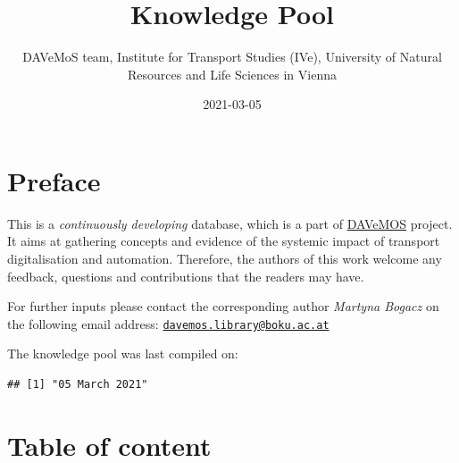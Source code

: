 \documentclass[
]{book}
\title{Knowledge Pool}
\author{DAVeMoS team, Institute for Transport Studies (IVe), University of Natural Resources and Life Sciences in Vienna}
\date{2021-03-05}
\begin{document}
\maketitle

{
\setcounter{tocdepth}{1}
\tableofcontents
}
\hypertarget{preface}{%
\chapter*{Preface}\label{preface}}

This is a \emph{continuously developing} database, which is a part of \href{https://www.davemos.online/}{DAVeMOS} project. It aims at gathering concepts and evidence of the systemic impact of transport digitalisation and automation. Therefore, the authors of this work welcome any feedback, questions and contributions that the readers may have.

For further inputs please contact the corresponding author \emph{Martyna Bogacz} on the following email address: \href{mailto:davemos.library@boku.ac.at}{\nolinkurl{davemos.library@boku.ac.at}}

The knowledge pool was last compiled on:

\begin{verbatim}
## [1] "05 March 2021"
\end{verbatim}

\hypertarget{table-of-content}{%
\chapter*{Table of content}\label{table-of-content}}
\end{document}
